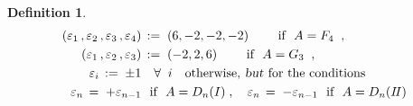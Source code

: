 \documentclass[12pt,reqno,twoside,a4paper]{amsart}
\numberwithin{equation}{section}
\theoremstyle{definition}
\newtheorem{definition}[lema]{Definition}
\newtheorem{free text}[lema]{}
\theoremstyle{remark}
\theoremstyle{plain}
\begin{document}
\begin{definition}
%
%
%
\begin{equation}
  \begin{aligned}
   (\varepsilon_1\,,\varepsilon_2\,,\varepsilon_3\,,\varepsilon_4)  &  \, := \;  (6,-2,-2,-2)
   \qquad  \text{ if } \  A = F_4 \;\; ,  \\
   (\varepsilon_1\,,\varepsilon_2\,,\varepsilon_3)  &  \, := \;  (-2,2,6)  \qquad   \text{ if } \  A = G_3 \;\; ,  \\
   \varepsilon_i \, := \; \pm 1  &  \quad \forall \;\; i \quad  \text{otherwise,  \textsl{but\/}  for the conditions}  \\
   \varepsilon_n \,= \; +\varepsilon_{n-1}  &  \text{\ \ if } \  A = D_n(I) \; ,  \quad  \varepsilon_n \,= \; -\varepsilon_{n-1}  \text{\ \ if } \  A = D_n(I\!I)
%
  \end{aligned}
%
\end{equation}
%


\end{definition}
\end{document}
